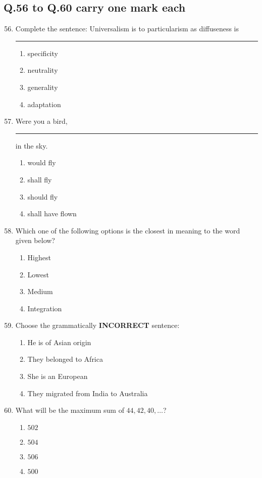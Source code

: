 \documentclass[journal,12pt,onecolumn]{IEEEtran}
\theoremstyle{remark}
\begin{document}
\subsection{\textbf{Q.56 to Q.60 carry one mark each}}
\begin{enumerate}\setcounter{enumi}{55}
    \item Complete the sentence:
Universalism is to particularism as diffuseness is \rule{1cm}{0.15mm}
\begin{multicols}{4}
    \begin{enumerate}
        \item specificity
        \item neutrality
        \item generality
        \item adaptation
    \end{enumerate}
\end{multicols}
\item Were you a bird, \rule{1cm}{0.15mm} in the sky.
\begin{multicols}{4}
    \begin{enumerate}
        \item would fly
        \item shall fly
        \item should fly
        \item shall have flown
    \end{enumerate}
\end{multicols}
\item Which one of the following options is the closest in meaning to the word given below?
\begin{multicols}{4}
    \begin{enumerate}
        \item Highest
        \item Lowest
        \item Medium
        \item Integration
    \end{enumerate}
\end{multicols}
\item Choose the grammatically \textbf{INCORRECT} sentence:
\begin{enumerate}
    \item He is of Asian origin
    \item They belonged to Africa
    \item She is an European
    \item They migrated from India to Australia
\end{enumerate}
\item What will be the maximum sum of $44, 42, 40, \dots $?
\begin{multicols}{4}
    \begin{enumerate}
        \item $502$
        \item $504$
        \item $506$
        \item $500$
    \end{enumerate}
\end{multicols}
\end{enumerate}
\end{document}
